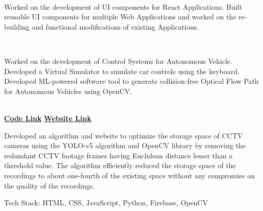 \documentclass[a4paper]{MagicalCV}
\begin{document}
\hfill
\begin{minipage}[t]{0.66\textwidth} 


 \\
\vspace{\topsep} %
\begin{tightemize}
\item Worked on the development of UI components for React Applications. Built reusable UI components for multiple Web Applications and worked on the re-building and functional modifications of existing Applications.
\end{tightemize}
\sectionsep

 \\
\vspace{\topsep} %
\begin{tightemize}
\item Worked on the development of Control Systems for Autonomous Vehicle. Developed a Virtual Simulator to simulate car controls using the keyboard. Developed ML-powered software tool to generate collision-free Optical Flow Path for Autonomous Vehicles using OpenCV.
\end{tightemize}
\sectionsep


 \\
\vspace{\topsep} %
\href{https://github.com/satviktiwari/Minor-Project}{\bf Code Link} \textbullet{} \href{https://cctvprocessing.netlify.app/}{\bf Website Link}
\begin{tightemize}
\item Developed an algorithm and website to optimize the storage space of CCTV cameras using the YOLO-v5 algorithm and OpenCV library by removing the redundant CCTV footage frames having Euclidean distance lesser than a threshold value. The algorithm efficiently reduced the storage space of the recordings to about one-fourth of the existing space without any compromise on the quality of the recordings. 
\item Tech Stack: HTML, CSS, JavaScript, Python, Firebase, OpenCV
\end{tightemize}
\sectionsep


\end{minipage}
\end{document}
